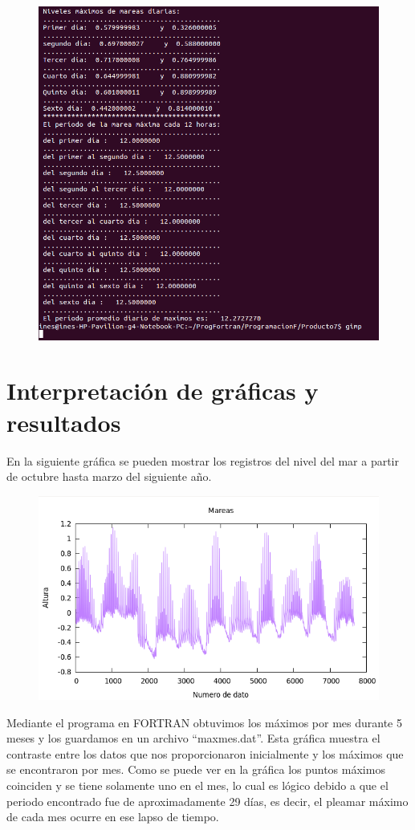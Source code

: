\begin{figure}[ht]
\centering
\includegraphics[width=10 cm]{terminal2.png}
\end{figure}

\clearpage

\newpage 


\section{Interpretación de gráficas y resultados}

En la siguiente gráfica se pueden mostrar los registros del nivel del mar a partir de octubre hasta  marzo del siguiente año.

\begin{figure}[ht]
\includegraphics[width=11 cm]{mareas.png}
\end{figure}

Mediante el programa en FORTRAN obtuvimos los máximos por mes durante 5 meses y los guardamos en un archivo “maxmes.dat”.  Esta gráfica muestra el contraste entre los datos que nos proporcionaron inicialmente y los máximos que se encontraron por mes. Como se puede ver en la gráfica los puntos máximos coinciden y se tiene solamente uno en el mes, lo cual es lógico debido a que el periodo encontrado fue de aproximadamente 29 días, es decir, el pleamar máximo de cada mes ocurre en ese lapso de tiempo.



